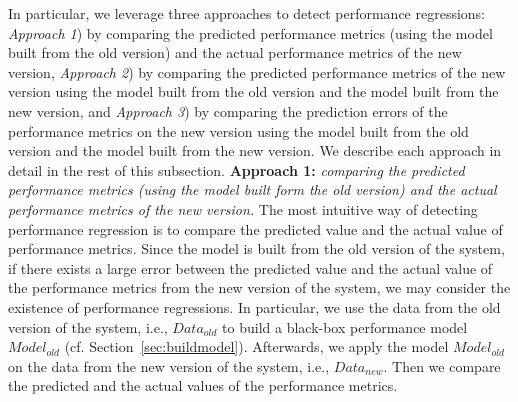 In particular, we leverage three approaches to detect performance regressions: \emph{Approach 1}) by comparing the predicted performance metrics (using the model built from the old version) and the actual performance metrics of the new version, \emph{Approach 2}) by comparing the predicted performance metrics of the new version using the model built from the old version and the model built from the new version, and \emph{Approach 3}) by comparing the prediction errors of the performance metrics on the new version using the model built from the old version and the model built from the new version. We describe each approach in detail in the rest of this subsection.
\noindent\textbf{Approach 1: }\emph{comparing the predicted performance metrics (using the model built form the old version) and the actual performance metrics of the new version.} %
The most intuitive way of detecting performance regression is to compare the predicted value and the actual value of performance metrics. Since the model is built from the old version of the system, if there exists a large error between the predicted value and the actual value of the performance metrics from the new version of the system, we may consider the existence of performance regressions. In particular, we use the data from the old version of the system, i.e., $Data_{old}$ to build a black-box performance model $Model_{old}$ (cf. Section~\ref{sec:buildmodel}). Afterwards, we apply the model $Model_{old}$ on the data from the new version of the system, i.e., $Data_{new}$. Then we compare the predicted and the actual values of the performance metrics.


